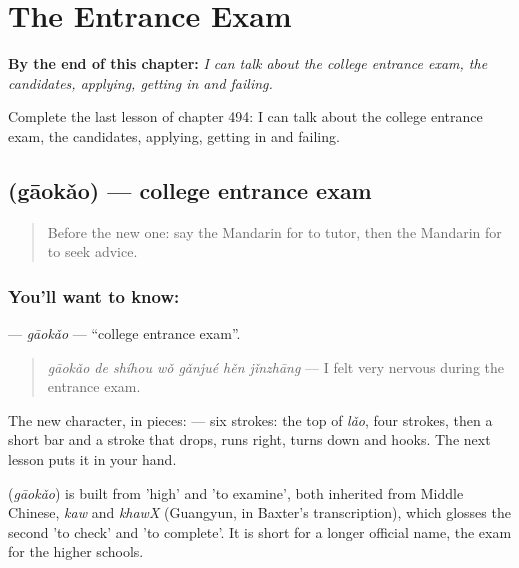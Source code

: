 
\chapter{The Entrance Exam}
\label{ch:zh-the-entrance-exam}

\begin{chapteropening}
\textbf{By the end of this chapter:} \emph{I can talk about the college entrance exam, the candidates, applying, getting in and failing.}

Complete the last lesson of chapter 494: I can talk about the college entrance exam, the candidates, applying, getting in and failing.
\end{chapteropening}

\section[\texorpdfstring{\zh{高考} (gāokǎo)}{高考 (gāokǎo)}]{ (gāokǎo) — college entrance exam}

\label{lesson:ZH-C494-gaokao}



\begin{quote}
Before the new one: say the Mandarin for to tutor, then the Mandarin for to seek advice.
\end{quote}

\subsection*{You'll want to know: }
\textbf{} — \emph{gāokǎo} — \textquotedblleft{}college entrance exam\textquotedblright{}.

\begin{quote}
\emph{gāokǎo de shíhou wǒ gǎnjué hěn jǐnzhāng} — I felt very nervous during the entrance exam.
\end{quote}

The new character, in pieces:  — six strokes: the top of  \emph{lǎo}, four strokes, then a short bar and a stroke that drops, runs right, turns down and hooks. The next lesson puts it in your hand.

\begin{cousinweb}
\textbf{} (\emph{gāokǎo}) is built from  'high' and  'to examine', both inherited from Middle Chinese, \emph{kaw} and \emph{khawX} (Guangyun, in Baxter's transcription), which glosses the second 'to check' and 'to complete'. It is short for a longer official name, the exam for the higher schools.
\end{cousinweb}

